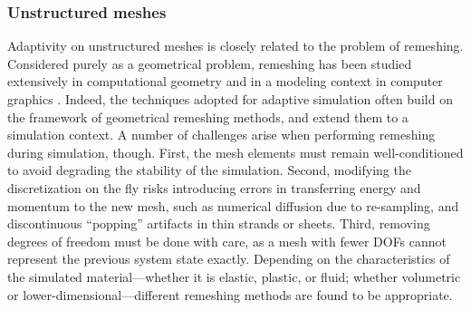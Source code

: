 \subsubsection{Unstructured meshes}
\label{sec:meshes}
Adaptivity on unstructured meshes is closely related to the problem of remeshing.
Considered purely as a geometrical problem, remeshing has been studied extensively in computational geometry \cite{Cheng2012} and in a modeling context in computer graphics \cite{Alliez2008}.
Indeed, the techniques adopted for adaptive simulation often build on the framework of geometrical remeshing methods, and extend them to a simulation context.
A number of challenges arise when performing remeshing during simulation, though.
First, the mesh elements must remain well-conditioned to avoid degrading the stability of the simulation.
Second, modifying the discretization on the fly risks introducing errors in transferring energy and momentum to the new mesh, such as numerical diffusion due to re-sampling, and discontinuous ``popping'' artifacts in thin strands or sheets.
Third, removing degrees of freedom must be done with care, as a mesh with fewer DOFs cannot represent the previous system state exactly.
Depending on the characteristics of the simulated material---whether it is elastic, plastic, or fluid; whether volumetric or lower-dimensional---different remeshing methods are found to be appropriate.
